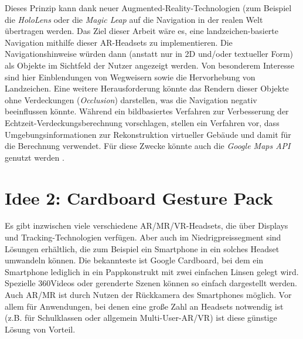 \documentclass[a4paper]{scrartcl}
\begin{document}
Dieses Prinzip kann dank neuer Augmented-Reality-Technologien (zum Beispiel die \emph{HoloLens} oder die \emph{Magic Leap} auf die Navigation in der realen Welt übertragen werden.
Das Ziel dieser Arbeit wäre es, eine landzeichen-basierte Navigation mithilfe dieser AR-Headsets zu implementieren.
Die Navigationshinweise würden dann (anstatt nur in 2D und/oder textueller Form) als Objekte im Sichtfeld der Nutzer angezeigt werden.
Von besonderem Interesse sind hier Einblendungen von Wegweisern sowie die Hervorhebung von Landzeichen.
Eine weitere Herausforderung könnte das Rendern dieser Objekte ohne Verdeckungen (\emph{Occlusion}) darstellen, was die Navigation negativ beeinflussen könnte.
Während \textcite{Walton2017} ein bildbasiertes Verfahren zur Verbesserung der Echtzeit-Verdeckungsberechnung vorschlagen, stellen \textcite{Kasperi2017} ein Verfahren vor, dass Umgebungsinformationen zur Rekonstruktion virtueller Gebäude und damit für die Berechnung verwendet.
Für diese Zwecke könnte auch die \emph{Google Maps API} genutzt werden \parencite{Google2018}.


\section*{Idee 2: Cardboard Gesture Pack}
Es gibt inzwischen viele verschiedene AR/MR/VR-Headsets, die über Displays und Tracking-Technologien verfügen.
Aber auch im Niedrigpreissegment sind Lösungen erhältlich, die zum Beispiel ein Smartphone in ein solches Headset umwandeln können.
Die bekannteste ist Google Cardboard, bei dem ein Smartphone lediglich in ein Pappkonstrukt mit zwei einfachen Linsen gelegt wird.
Spezielle 360\degree Videos oder gerenderte Szenen können so einfach dargestellt werden.
Auch AR/MR ist durch Nutzen der Rückkamera des Smartphones möglich.
Vor allem für Anwendungen, bei denen eine große Zahl an Headsets notwendig ist (z.B. für Schulklassen oder allgemein Multi-User-AR/VR) ist diese günstige Lösung von Vorteil.
\end{document}
